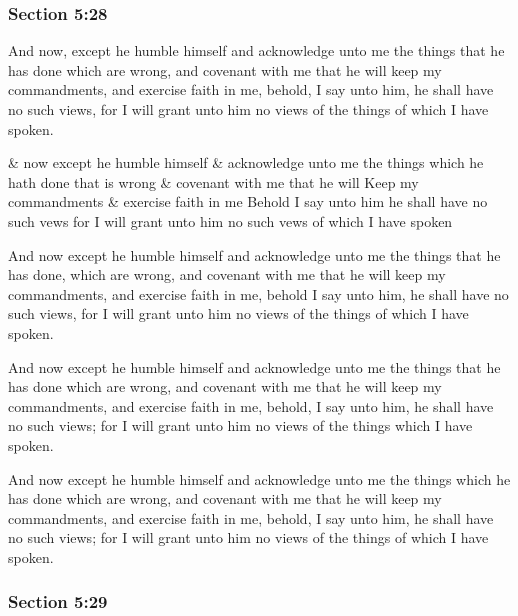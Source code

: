 	\subsubsection{Section 5:28} %
		\label{DC5-28}

		And now, except he humble himself and acknowledge unto me the things that he has done which are wrong, and covenant with me that he will keep my commandments, and exercise faith in me, behold, I say unto him, he shall have no such views, for I will grant unto him no views of the things of which I have spoken.

		\begin{framed}
		\scriptsize
			\begin{compactdesc}
				\item[JSP] \& now except he humble himself \& acknowledge unto me the things which he hath done that is wrong \& covenant with me that he will Keep my commandments \& exercise faith in me Behold I say unto him he shall have no such vews for I will grant unto him no such vews of which I have spoken
				\item[RB1] [\textit{missing}]
				\item[BC] And now except he humble himself and acknowledge unto me the things that he has done, which are wrong, and covenant with me that he will keep my commandments, and exercise faith in me, behold I say unto him, he shall have no such views, for I will grant unto him no views of the things of which I have spoken.
				\item[DC 1835] And now except he humble himself and acknowledge unto me the things that he has done which are wrong, and covenant with me that he will keep my commandments, and exercise faith in me, behold, I say unto him, he shall have no such views; for I will grant unto him no views of the things which I have spoken.
				\item[DC 1844] And now except he humble himself and acknowledge unto me the things which he has done which are wrong, and covenant with me that he will keep my commandments, and exercise faith in me, behold, I say unto him, he shall have no such views; for I will grant unto him no views of the things of which I have spoken.
			\end{compactdesc}
		\end{framed}

	\subsubsection{Section 5:29} %
		\label{DC5-29}

